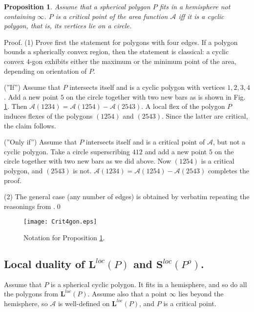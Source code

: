 \documentclass[12pt]{amsart}
\theoremstyle{plain}
\newtheorem{proposition}{Proposition}
\theoremstyle{definition}
\theoremstyle{remark}
\theoremstyle{plain}
\theoremstyle{definition}
\begin{document}
\begin{proposition}\label{PropSphCrit}
  Assume that a spherical polygon $P$ fits in a hemisphere not containing $\infty$. $P$  is a critical point of the area function $\mathcal{A}$ iff it is a cyclic polygon, that is, its vertices lie on a circle.
\end{proposition}
Proof.
(1) Prove first the statement for  polygons with four edges.
If a polygon bounds a spherically convex  region, then the statement is classical: a cyclic convex  $4$-gon exhibits either the maximum or the minimum point of the area, depending on orientation of $P$.

(''If'') Assume  that $P$ intersects itself  and is a cyclic polygon with vertices $1,2,3,4$. Add a new point $5$ on the circle  together with two new bars as is shown in Fig. \ref{fourgon}.  Then $\mathcal{A}(1234)=\mathcal{A}(1254)-\mathcal{A}(2543)$.  A local flex of the polygon $P$ induces flexes of the polygons
$(1254)$ and $(2543)$. Since the latter are critical, the claim follows.

(''Only if'') Assume that  $P$ intersects itself  and is a  critical point of $\mathcal{A}$, but not a cyclic polygon.  Take a circle superscribing $412$ and add  a new point $5$ on the circle  together with two new bars as we did above.  Now $(125 4)$ is a critical polygon, and  $(2543)$  is not.
 $\mathcal{A}(1234)=\mathcal{A}(1254)-\mathcal{A}(2543)$ completes the proof.


(2) The general case (any number of edges) is obtained by verbatim repeating  the reasonings from \cite{khipan}.\qed
\begin{figure}[h]
\centering \texttt{[image: Crit4gon.eps]}
\caption{Notation for Proposition \ref{PropSphCrit}.}\label{fourgon}
\end{figure}



\subsection*{Local duality of $\mathbf{L}^{loc}(P)$  and $\mathbf{S}^{loc}(P^o)$. }
Assume that $P$ is a spherical cyclic polygon. It fits in a hemisphere, and so do all the polygons from $\mathbf{L}^{loc}(P)  $.
Assume also that a point  $\infty$ lies beyond the hemisphere, so $\mathcal{A}$ is well-defined on $\mathbf{L}^{loc}(P)  $,
and $P$ is a critical point.
\end{document}
